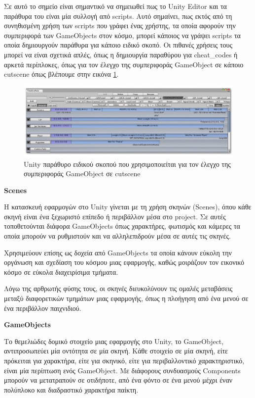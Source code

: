Σε αυτό το σημείο είναι σημαντικό να σημειωθεί πως το Unity Editor και τα παράθυρα του είναι μία συλλογή από scripts. Αυτό σημαίνει, πως εκτός από τη συνηθισμένη χρήση των scripts που γράφει ένας χρήστης, τα οποία αφορούν την συμπεριφορά των GameObjects στον κόσμο, μπορεί κάποιος να γράψει scripts τα οποία δημιουργούν παράθυρα για κάποιο ειδικό σκοπό. Οι πιθανές χρήσεις τους μπορεί να είναι σχετικά απλές, όπως η δημιουργία παραθύρου για \glspl{cheat_code} ή αρκετά περίπλοκες, όπως για τον έλεγχο της συμπεριφοράς GameObject σε κάποιο cutscene όπως βλέπουμε στην εικόνα \ref{fig:unity_custom_editor_windows}\cite{technologies_unity_nodate}.

\begin{figure}[H]
    \centering
    \includegraphics[width=1\linewidth]{sections/4/1/images/unity_custom_editor_windows}
    \caption{Unity παράθυρο ειδικού σκοπού που χρησιμοποιείται για τον έλεγχο της συμπεριφοράς GameObject σε cutscene}
    \label{fig:unity_custom_editor_windows}
\end{figure}

\textbf{Scenes}

Η κατασκευή εφαρμογών στο Unity γίνεται με τη χρήση σκηνών (Scenes), όπου κάθε σκηνή είναι ένα ξεχωριστό επίπεδο ή περιβάλλον μέσα στο project. Σε αυτές τοποθετούνται διάφορα GameObjects όπως χαρακτήρες, φωτισμός και κάμερες τα οποία μπορούν να ρυθμιστούν και να αλληλεπιδρούν μέσα σε αυτές τις σκηνές.

Χρησιμεύουν επίσης ως δοχεία από GameObjects τα οποία κάνουν εύκολη την οργάνωση και σχεδίαση του κόσμου μιας εφαρμογής, καθώς μοιράζουν τον εικονικό κόσμο σε εύκολα διαχειρίσιμα τμήματα.

Λόγω της αρθρωτής φύσης τους, οι σκηνές διευκολύνουν τις ομαλές μεταβάσεις μεταξύ διαφορετικών τμημάτων μιας εφαρμογής, όπως η πλοήγηση από ένα μενού σε ένα περιβάλλον παιχνιδιού.

\textbf{GameObjects}

Το θεμελιώδες δομικό στοιχείο μιας εφαρμογής στο Unity, το GameObject, αντιπροσωπεύει μία οντότητα σε μία σκηνή. Κάθε στοιχείο σε μία σκηνή, είτε πρόκειται για χαρακτήρα, είτε για σκηνικό, είτε για περιβαλλοντικό χαρακτηριστικό, είναι μία περίπτωση ενός GameObject. Με διάφορους συνδυασμούς Components μπορούν να μετατραπούν σε οτιδήποτε, από ένα φόντο σε ένα μενού μέχρι έναν πολύπλοκο και διαδραστικό χαρακτήρα παίκτη.

